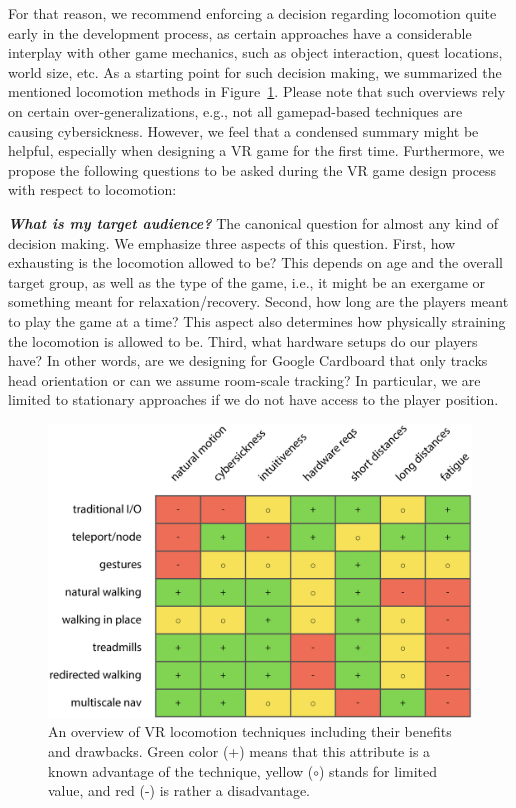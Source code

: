 For that reason, we recommend enforcing a decision regarding locomotion quite early in the development process, as certain approaches have a considerable interplay with other game mechanics, such as object interaction, quest locations, world size, etc. As a starting point for such decision making, we summarized the mentioned locomotion methods in Figure~\ref{fig:overview}. Please note that such overviews rely on certain over-generalizations, e.g., not all gamepad-based techniques are causing cybersickness. However, we feel that a condensed summary might be helpful, especially when designing a VR game for the first time. Furthermore, we propose the following questions to be asked during the VR game design process with respect to locomotion:

\textbf{\textit{What is my target audience?}} The canonical question for almost any kind of decision making. We emphasize three aspects of this question. First, how exhausting is the locomotion allowed to be? This depends on age and the overall target group, as well as the type of the game, i.e., it might be an exergame or something meant for relaxation/recovery. Second, how long are the players meant to play the game at a time? This aspect also determines how physically straining the locomotion is allowed to be. Third, what hardware setups do our players have? In other words, are we designing for Google Cardboard that only tracks head orientation or can we assume room-scale tracking? In particular, we are limited to stationary approaches if we do not have access to the player position.


\begin{figure}[t]
\centering
\includegraphics[width=1.0\columnwidth]{content/images/chapter14_figure1.jpg}
\caption{An overview of VR locomotion techniques including their benefits and drawbacks. Green color (+) means that this attribute is a known advantage of the technique, yellow ($\circ$) stands for limited value, and red (-) is rather a disadvantage.}
\label{fig:overview}
\end{figure}


